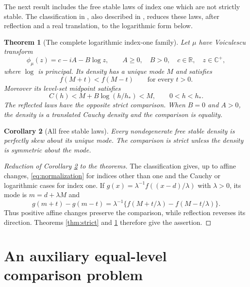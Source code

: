 \documentclass[11pt,a4paper]{article}
\newtheorem{theorem}{Theorem}[section]
\newtheorem{corollary}[theorem]{Corollary}
\theoremstyle{definition}
\theoremstyle{remark}
\numberwithin{equation}{section}
\newcommand{\R}{\mathbb{R}}
\newcommand{\Cplus}{\mathbb{C}^{+}}
\newcommand{\hp}{h_\ast}
\begin{document}
The next result includes the free stable laws of index one which are
not strictly stable. The classification in \cite[Appendix]{BP},
also described in \cite[p.~298]{HSW}, reduces these laws, after
reflection and a real translation, to the logarithmic form below.

\begin{theorem}[The complete logarithmic index-one family]
\label{thm:log}
Let $\mu$ have Voiculescu transform
\begin{equation}\label{eq:log-normal}
 \phi_\mu(z)=c-iA-B\log z,\qquad
 A\ge0,\quad B>0,\quad c\in\R,\quad z\in\Cplus,
\end{equation}
where $\log$ is principal. Its density has a unique mode $M$ and
satisfies
\begin{equation}\label{eq:log-main}
 f(M+t)<f(M-t)\qquad\text{for every }t>0.
\end{equation}
Moreover its level-set midpoint satisfies
\begin{equation}\label{eq:log-bound}
 C(h)<M+B\log(h/\hp)<M,\qquad 0<h<\hp.
\end{equation}
The reflected laws have the opposite strict comparison. When $B=0$
and $A>0$, the density is a translated Cauchy density and the comparison
is equality.
\end{theorem}

\begin{corollary}[All free stable laws]\label{cor:all}
Every nondegenerate free stable density is perfectly skew about its
unique mode. The comparison is strict unless the density is symmetric
about the mode.
\end{corollary}

\begin{proof}[Reduction of Corollary \ref{cor:all} to the theorems]
The classification \cite[Appendix]{BP} gives, up to affine changes,
\eqref{eq:normalization} for indices other than one and the
Cauchy or logarithmic cases for index one. If
$g(x)=\lambda^{-1}f((x-d)/\lambda)$ with $\lambda>0$, its mode is
$m=d+\lambda M$ and
\[
 g(m+t)-g(m-t)
 =\lambda^{-1}\{f(M+t/\lambda)-f(M-t/\lambda)\}.
\]
Thus positive affine changes preserve the comparison, while reflection
reverses its direction. Theorems \ref{thm:strict} and \ref{thm:log}
therefore give the assertion.
\end{proof}

\section{An auxiliary equal-level comparison problem}
\label{sec:principle}
\end{document}
